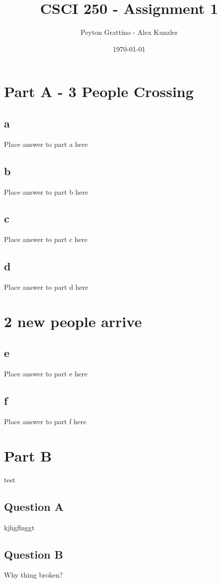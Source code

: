 \documentclass[12pt]{amsart}
\title{CSCI 250 - Assignment 1}
\author{Peyton Grattino - Alex Kunzler}
\date{\today} %
\begin{document}
\maketitle
\tableofcontents

\pagebreak

\section*{Part A - 3 People Crossing}

\subsection*{a}
Place answer to part a here

\subsection*{b}
Place answer to part b here

\subsection*{c}
Place answer to part c here

\subsection*{d}
Place answer to part d here

\section*{2 new people arrive}

\subsection*{e}
Place answer to part e here

\subsection*{f}
Place answer to part f here

\newpage

\section{Part B}
test
\subsection{Question A}
kjhgflnggt

\subsection{Question B}
Why thing broken?
\end{document}

